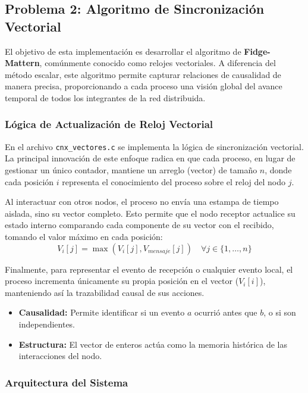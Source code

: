 \subsection{Problema 2: Algoritmo de Sincronización Vectorial}

El objetivo de esta implementación es desarrollar el algoritmo de \textbf{Fidge-Mattern}, comúnmente conocido como relojes vectoriales. A diferencia del método escalar, este algoritmo permite capturar relaciones de causalidad de manera precisa, proporcionando a cada proceso una visión global del avance temporal de todos los integrantes de la red distribuida.

\subsubsection{Lógica de Actualización de Reloj Vectorial}

En el archivo \texttt{cnx\_vectores.c} se implementa la lógica de sincronización vectorial. La principal innovación de este enfoque radica en que cada proceso, en lugar de gestionar un único contador, mantiene un arreglo (vector) de tamaño $n$, donde cada posición $i$ representa el conocimiento del proceso sobre el reloj del nodo $j$. 

Al interactuar con otros nodos, el proceso no envía una estampa de tiempo aislada, sino su vector completo. Esto permite que el nodo receptor actualice su estado interno comparando cada componente de su vector con el recibido, tomando el valor máximo en cada posición:
\[ V_i[j] = \max(V_i[j], V_{mensaje}[j]) \quad \forall j \in \{1, \dots, n\} \]

Finalmente, para representar el evento de recepción o cualquier evento local, el proceso incrementa únicamente su propia posición en el vector ($V_i[i]$), manteniendo así la trazabilidad causal de sus acciones.

\begin{itemize}
    \item \textbf{Causalidad:} Permite identificar si un evento $a$ ocurrió antes que $b$, o si son independientes.
    \item \textbf{Estructura:} El vector de enteros actúa como la memoria histórica de las interacciones del nodo.
\end{itemize}

\subsubsection{Arquitectura del Sistema}

